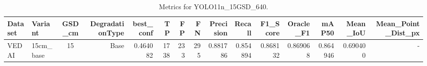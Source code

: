 \begin{table}
\caption{Metrics for YOLO11n_15GSD_640.}
\label{tab:rq1_results}
\begin{tabular}{llcrrrrrrrrrrrr}
\toprule
Dataset & Variant & GSD_cm & DegradationType & best_conf & TP & FP & FN & Precision & Recall & F1_Score & Oracle_F1 & mAP50 & Mean_IoU & Mean_Point_Dist_px \\
\midrule
VEDAI & 15cm_base & 15 & Base & 0.464082 & 1738 & 233 & 295 & 0.881786 & 0.854894 & 0.868132 & 0.869068 & 0.864946 & 0.690400 & - \\
\bottomrule
\end{tabular}
\end{table}
